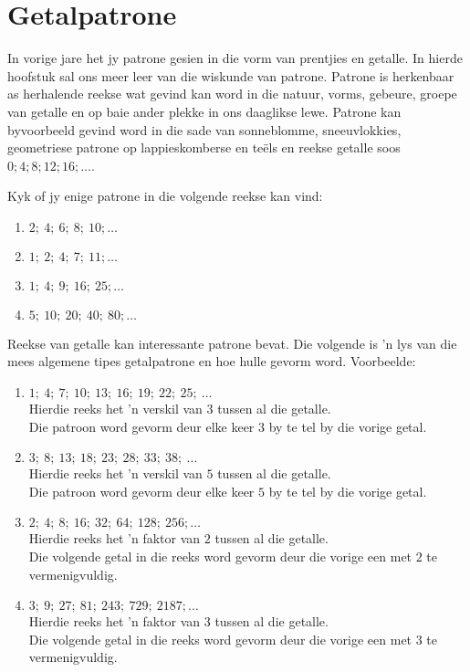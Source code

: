          \chapter{Getalpatrone}

In vorige jare het jy patrone gesien in die vorm van prentjies en getalle. In hierde hoofstuk sal ons meer leer
van die wiskunde van patrone. Patrone is herkenbaar as herhalende reekse wat gevind kan word in die natuur,
vorms, gebeure, groepe van getalle en op baie ander plekke in ons daaglikse lewe. Patrone kan byvoorbeeld
gevind word in die sade van sonneblomme, sneeuvlokkies, geometriese patrone op lappieskomberse en teëls en
reekse getalle soos $0;4;8;12;16;\ldots$.\par 
Kyk of jy enige patrone in die volgende reekse kan vind:
\begin{enumerate}[noitemsep, label=\textbf{\arabic*}. ] 
    \item $2;~4;~6;~8;~10;\ldots$
    \item $1;~2;~4;~7;~11;\ldots$
    \item $1;~4;~9;~16;~25;\ldots$
    \item $5;~10;~20;~40;~80;\ldots$
\end{enumerate}

   
Reekse van getalle kan interessante patrone bevat. Die volgende is ’n lys van die mees algemene tipes getalpatrone en
hoe hulle gevorm word.
Voorbeelde:
\begin{enumerate}[noitemsep, label=\textbf{\arabic*}. ] 
    \item $1;~4;~7;~10;~13;~16;~19;~22;~25;~\ldots$\\
    Hierdie reeks het ’n verskil van $3$ tussen al die getalle.\\Die patroon word gevorm deur elke keer
     $3$ by te tel by die vorige getal.
    \item $3;~8;~13;~18;~23;~28;~33;~38;~\ldots$\\
     Hierdie reeks het ’n verskil van $5$ tussen al die getalle. \\Die patroon word gevorm
    deur elke keer $5$ by te tel by die vorige getal.
    \item $2;~4;~8;~16;~32;~64;~128;~256;\ldots$\\
    Hierdie reeks het ’n faktor van $2$ tussen al die getalle. \\Die volgende getal in
    die reeks word gevorm deur die vorige een met $2$ te vermenigvuldig.
    \item $3;~9;~27;~81;~243;~729;~2187;\ldots$\\
    Hierdie reeks het ’n faktor van $3$ tussen al die getalle. \\Die volgende getal in
    die reeks word gevorm deur die vorige een met  $3$ te vermenigvuldig.
\end{enumerate}
     

